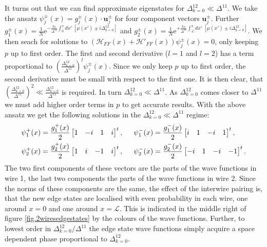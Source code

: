 It turns out that we can find approximate eigenstates for $\Delta^{12}_{k=0} \ll \Delta^{11}$. We take the ansatz $\psi_j^{\pm}(x) = g_j^{\pm}(x)\cdot \mathbf{u}^{\pm}_j$ for four component vectors $\mathbf{u}^{\pm}_j$. Further $g_1^{\pm}(x) = \frac{1}{N}\text{e}^{-\frac{k_F}{\Delta^{11}}\int_0^x dx' \; \left[\mu(x') \pm i\Delta^{12}_{k=0}\right] }$ and $g_2^{\pm}(x) = \frac{1}{N}\text{e}^{+\frac{k_F}{\Delta^{11}}\int_{\mathcal{L}}^x dx' \; \left[\mu(x') \pm i\Delta^{12}_{k=0}\right] }$. We then seach for solutions to $(\mathcal{H}_{FF}(x) + \mathcal{H}'_{FF}(x))\psi_j^{\pm}(x) = 0$, only keeping $p$ up to first order. The first and second derivative ($l = 1$ and $l = 2$) has a term proportional to $\left(\frac{\Delta^{12}_{k=0}}{\Delta^{11}}\right)^l\psi_j^{\pm}(x)$. Since we only keep $p$ up to first order, the second derivative must be small with respect to the first one. It is then clear, that $\left(\frac{\Delta^{12}_{k=0}}{\Delta^{11}}\right)^2 \ll \frac{\Delta^{12}_{k=0}}{\Delta^{11}}$ is required. In turn $\Delta^{12}_{k=0} \ll \Delta^{11}$. As $\Delta^{12}_{k=0}$ comes closer to $\Delta^{11}$ we must add higher order terms in $p$ to get accurate results. With the above ansatz we get the following solutions in the $\Delta^{12}_{k=0} \ll \Delta^{11}$ regime:
\begin{align}
\psi_1^{+}(x) &= \frac{g_1^{+}(x)}{2}\begin{bmatrix} 1 & -i & 1 & i \end{bmatrix}^t, \hspace{0.5cm} \psi_1^{-}(x) = \frac{g_1^{-}(x)}{2}\begin{bmatrix} i & 1 & -i & 1 \end{bmatrix}^t, \nonumber \\
\psi_2^{+}(x) &= \frac{g_2^{+}(x)}{2}\begin{bmatrix} 1 & i & -1 & i \end{bmatrix}^t, \hspace{0.5cm} \psi_2^{-}(x) = \frac{g_2^{-}(x)}{2}\begin{bmatrix} -i & 1 & -i & -1 \end{bmatrix}^t.
\label{eq.zeromodesDelta12real}
\end{align}
The two first components of these vectors are the parts of the wave functions in wire 1, the last two components the parts of the wave functions in wire 2. Since the norms of these components are the same, the effect of the interwire pairing is, that the new edge states are localised with even probability in each wire, one around $x = 0$ and one around $x = \mathcal{L}$. This is indicated in the middle right of figure \ref{fig.2wiresedgestates} by the colours of the wave functions. Further, to lowest order in $\Delta^{12}_{k = 0}/\Delta^{11}$ the edge state wave functions simply acquire a space dependent phase proportional to $\Delta^{12}_{k=0}$.  

